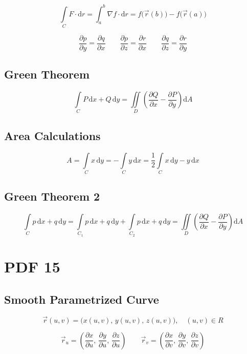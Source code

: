 \documentclass[12pt, fleqn]{book}
\newcommand{\D}{\mathrm{d}}
\newcommand{\ic}{\int\limits_C}
\newcommand{\uv}{(u, v)}
\newcommand{\rond}[2]{\frac{\partial #1}{\partial #2}}
\begin{document}
		\begin{equation}
			\ic  F \cdot \D r = \int_{a}^{b} \nabla f \cdot \D r = f\big(\vec{r}(b)\big) - f\big(\vec{r}(a)\big)
		\end{equation}     
		
		\begin{equation}
			\rond{p}{y} = \rond{q}{x} \qquad
			\rond{p}{z} = \rond{r}{x} \qquad
			\rond{q}{z} = \rond{r}{y}
		\end{equation}
		
		\section{Green Theorem}
			\begin{equation}
				\ic  P \, \D x + Q \, \D y = \iint\limits_D \left(\rond{Q}{x} - \rond{P}{y}\right) \D A
			\end{equation}
		
		\section{Area Calculations}
			\begin{equation}
				A = \ic  x \, \D y = - \ic  y \, \D x = \frac{1}{2} \ic  x \, \D y - y \, \D x
			\end{equation}

		\section{Green Theorem 2}
			\begin{equation}
				\ic  p \, \D x + q \, \D y = \int\limits_{C_{1}} p \, \D x + q \, \D y + \int\limits_{C_{2}} p \, \D x + q \, \D y = \iint\limits_D \left(\rond{Q}{x} - \rond{P}{y}\right) \D A
			\end{equation}
		
\chapter{PDF 15}\label{pdf15}
	\section{Smooth Parametrized Curve}
		\begin{equation}
			\vec{r}\uv = \big(x\uv, \, y\uv, \, z\uv\big), \quad \uv \in R
		\end{equation}
		
		\begin{equation}
			\vec{r}_u = (\rond{x}{u}, \, \rond{y}{u}, \, \rond{z}{u}) \qquad \vec{r}_v = (\rond{x}{v}, \, \rond{y}{v}, \, \rond{z}{v}) 
		\end{equation}	
\end{document}
